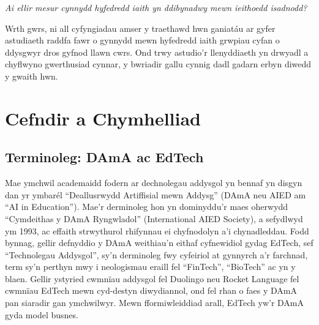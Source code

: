 \textit{Ai ellir mesur cynnydd hyfedredd iaith yn ddibynadwy mewn ieithoedd isadnodd?}

Wrth gwrs, ni all cyfyngiadau amser y traethawd hwn ganiatáu ar gyfer astudiaeth raddfa fawr o gynnydd mewn hyfedredd iaith grwpiau cyfan o ddysgwyr dros gyfnod llawn cwrs. Ond trwy astudio'r llenyddiaeth yn drwyadl a chyflwyno gwerthusiad cynnar, y bwriadir gallu cynnig dadl gadarn erbyn diwedd y gwaith hwn.

\section{Cefndir a Chymhelliad}
    \subsection{Terminoleg: DAmA ac EdTech}
Mae ymchwil academaidd fodern ar dechnolegau addysgol yn bennaf yn disgyn dan yr ymbarél ``Deallusrwydd Artiffisial mewn Addysg'' (DAmA neu AIED am ``AI in Education''). Mae'r derminoleg hon yn dominyddu'r maes oherwydd ``Cymdeithas y DAmA Ryngwladol'' (International AIED Society), a sefydlwyd ym 1993, ac effaith strwythurol rhifynnau ei chyfnodolyn a'i chynadleddau. Fodd bynnag, gellir defnyddio y DAmA weithiau'n eithaf cyfnewidiol gydag EdTech, sef ``Technolegau Addysgol'', sy'n derminoleg fwy cyfeiriol at gynnyrch a'r farchnad, term sy'n perthyn mwy i neologismau eraill fel ``FinTech'', ``BioTech'' ac yn y blaen. Gellir ystyried cwmnïau addysgol fel Duolingo neu Rocket Language fel cwmnïau EdTech mewn cyd-destyn diwydiannol, ond fel rhan o faes y DAmA pan siaradir gan ymchwilwyr. Mewn fformiwleiddiad arall, EdTech yw'r DAmA gyda model busnes.

